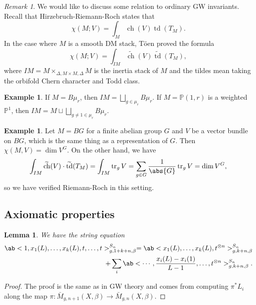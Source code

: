 \documentclass{amsart}
\newtheorem{lem}[thm]{Lemma}
\theoremstyle{definition}
\newtheorem{exm}[thm]{Example}
\theoremstyle{remark}
\newtheorem{rmk}[thm]{Remark}
\theoremstyle{plain}
\theoremstyle{definition}
\theoremstyle{remark}
\renewcommand{\P}{\mathbb{P}}
\newcommand{\on}[1]{\operatorname{#1}}
\newcommand{\wt}[1]{\widetilde{#1}}
\newcommand{\1}{\mathbf{1}}
\newcommand{\2}{\mathbf{2}}
\newcommand{\3}{\mathbf{3}}
\begin{document}
\begin{rmk}
    We would like to discuss some relation to ordinary GW invariants. Recall that Hirzebruch-Riemann-Roch states that 
    \[ \chi(M; V) = \int_M \on{ch}(V) \on{td}(T_M). \]
    In the case where \(M\) is a smooth DM stack, T\"oen proved the formula
    \[ \chi(M; V) = \int_{IM} \wt{\on{ch}}(V) \wt{\on{td}}(T_M), \]
    where \(IM = M \times_{\Delta, M \times M, \Delta} M\) is the inertia stack of \(M\) and the tildes mean taking the orbifold Chern character and Todd class. 
\end{rmk}

\begin{exm}
    If \(M = B\mu_r\), then \(IM = \bigsqcup_{g \in \mu_r} B \mu_r\). If \(M = \P(1, r)\) is a weighted \(\P^1\), then \(IM = M \sqcup \bigsqcup_{g \neq 1 \in \mu_r} B\mu_r\).    
\end{exm}

\begin{exm}
    Let \(M = BG\) for a finite abelian group \(G\) and \(V\) be a vector bundle on \(BG\), which is the same thing as a representation of \(G\). Then \(\chi(M, V) = \dim V^G\). On the other hand, we have
    \[ \int_{IM} \wt{\on{ch}}(V) \cdot \wt{\on{td}}(T_M) = \int_{IM} \on{tr}_g V = \sum_{g \in G} \frac{1}{\abs{G}} \on{tr}_g V = \dim V^G, \]
    so we have verified Riemann-Roch in this setting.
\end{exm}

\subsection{Axiomatic properties}%
\label{sub:Axiomatic properties}

\begin{lem}
    We have the \textit{string equation}
    \begin{align*}
        \ab< 1, x_1(L), \ldots, x_k(L), t, \ldots, t >_{g, 1+k+n, \beta}^{S_n} = \ab<x_1(L), \ldots, x_k(L), t^{\otimes n}>^{S_n}_{g,k+n,\beta} \\
        + \sum_i \ab< \cdots, \frac{x_i(L) - x_i(1)}{L-1}, \ldots, t^{\otimes n}>^{S_n}_{g,k+n,\beta}. 
    \end{align*}
\end{lem}

\begin{proof}
    The proof is the same as in GW theory and comes from computing \(\pi^* L_i\) along the map \(\pi \colon\bar{M}_{g,n+1}(X,\beta) \to \bar{M}_{g,n}(X,\beta)\).
\end{proof}
\end{document}
